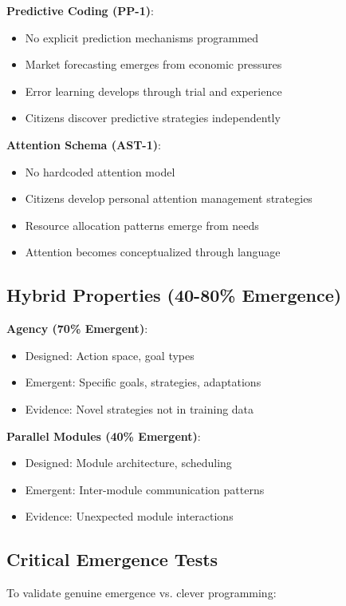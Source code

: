 \textbf{Predictive Coding (PP-1)}:
\begin{itemize}
    \item No explicit prediction mechanisms programmed
    \item Market forecasting emerges from economic pressures
    \item Error learning develops through trial and experience
    \item Citizens discover predictive strategies independently
\end{itemize}

\textbf{Attention Schema (AST-1)}:
\begin{itemize}
    \item No hardcoded attention model
    \item Citizens develop personal attention management strategies
    \item Resource allocation patterns emerge from needs
    \item Attention becomes conceptualized through language
\end{itemize}

\subsection{Hybrid Properties (40-80\% Emergence)}

\textbf{Agency (70\% Emergent)}:
\begin{itemize}
    \item Designed: Action space, goal types
    \item Emergent: Specific goals, strategies, adaptations
    \item Evidence: Novel strategies not in training data
\end{itemize}

\textbf{Parallel Modules (40\% Emergent)}:
\begin{itemize}
    \item Designed: Module architecture, scheduling
    \item Emergent: Inter-module communication patterns
    \item Evidence: Unexpected module interactions
\end{itemize}

\subsection{Critical Emergence Tests}

To validate genuine emergence vs. clever programming:

